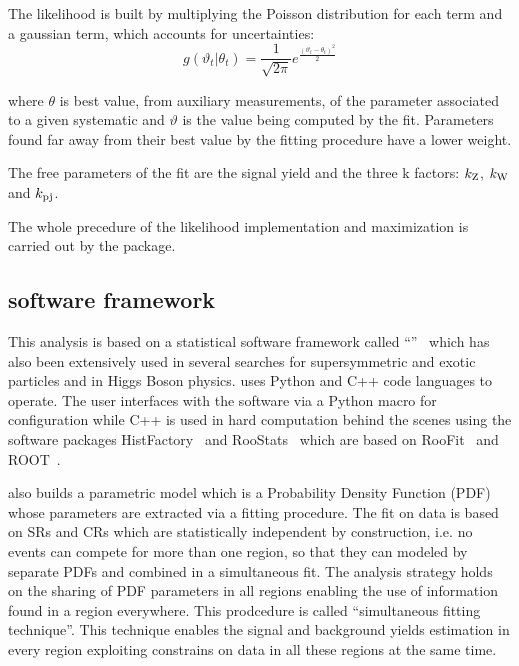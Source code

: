 The likelihood is built by multiplying the Poisson distribution for each term and a gaussian term, which accounts for uncertainties:
\begin{equation}
   g(\vartheta_{t} \vert \theta_{t}) = \frac{1}{\sqrt{2\pi}}e^{\frac{(\vartheta_{t}-\theta_{t})^2}{2} } 
   \label{eqn:gauss}
\end{equation} 

where $\theta$ is best value, from auxiliary measurements, of the parameter associated to a given systematic and $\vartheta$ is the value being computed by the fit. Parameters found far away from their best value by the fitting procedure have a lower weight.

The free parameters of the fit are the signal yield and the three k factors: $k_{\textup{Z}}$, $k_{\textup{W}}$ and $k_{\textup{pj}}$.

The whole precedure of the likelihood implementation and maximization is carried out by the \hf package.

\subsection{\hf software framework}

This analysis is based on a statistical software framework called ``\hf''~\cite{baak:histfitter} which has also been extensively used in several searches for supersymmetric and exotic particles and in Higgs Boson physics. 
\hf uses Python and C++ code languages to operate. The user interfaces with the software via a Python macro for configuration while C++ is used in hard computation behind the scenes using the software packages HistFactory~\cite{Cranmer:1456844} and RooStats~\cite{2010acat.confE..57M} which are based on RooFit~\cite{2003physics...6116V} and ROOT~\cite{Brun:1997pa}.

\hf also builds a parametric model which is a Probability Density Function (PDF) whose parameters are extracted via a fitting procedure. The fit on data is based on SRs and CRs which are statistically independent by construction, i.e. no events can compete for more than one region, so that they can modeled by separate PDFs and combined in a simultaneous fit. The \hf analysis strategy holds on the sharing of PDF parameters in all regions enabling the use of information found in a region everywhere. This prodcedure is called ``simultaneous fitting technique''. This technique enables the signal and background yields estimation in every region exploiting constrains on data in all these regions at the same time.

